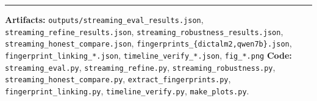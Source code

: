 \documentclass[11pt,a4paper]{article}
\begin{document}
\vspace{1em}
\hrule
\vspace{0.4em}
\raggedright
{\small
\textbf{Artifacts:} \texttt{outputs/streaming\_eval\_results.json},
\texttt{streaming\_refine\_results.json}, \texttt{streaming\_robustness\_results.json},
\texttt{streaming\_honest\_compare.json}, \texttt{fingerprints\_\{dictalm2,qwen7b\}.json},
\texttt{fingerprint\_linking\_*.json}, \texttt{timeline\_verify\_*.json}, \texttt{fig\_*.png} \newline
\textbf{Code:} \texttt{streaming\_eval.py}, \texttt{streaming\_refine.py},
\texttt{streaming\_robustness.py}, \texttt{streaming\_honest\_compare.py},
\texttt{extract\_fingerprints.py}, \texttt{fingerprint\_linking.py},
\texttt{timeline\_verify.py}, \texttt{make\_plots.py}.
}
\end{document}
